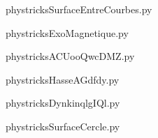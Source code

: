     \newcommand{\CaptionFigSurfaceEntreCourbes}{<+Type your caption here+>}
    \begin{center}
        
    \end{center}
    phystricksSurfaceEntreCourbes.py

    

    \clearpage
    


    \newcommand{\CaptionFigExoMagnetique}{<+Type your caption here+>}
    \begin{center}
        
    \end{center}
    phystricksExoMagnetique.py

    

    \clearpage
    


    \newcommand{\CaptionFigACUooQwcDMZ}{<+Type your caption here+>}
    \begin{center}
        
    \end{center}
    phystricksACUooQwcDMZ.py

    

    \clearpage
    


    \newcommand{\CaptionFigHasseAGdfdy}{<+Type your caption here+>}
    \begin{center}
        
    \end{center}
    phystricksHasseAGdfdy.py

    

    \clearpage
    


    \newcommand{\CaptionFigDynkinqlgIQl}{<+Type your caption here+>}
    \begin{center}
        
    \end{center}
    phystricksDynkinqlgIQl.py

    

    \clearpage
    


    \newcommand{\CaptionFigSurfaceCercle}{<+Type your caption here+>}
    \begin{center}
        
    \end{center}
    phystricksSurfaceCercle.py

